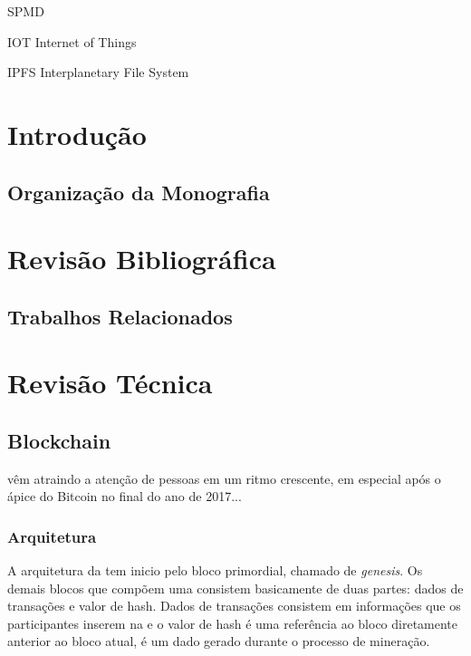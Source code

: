 \documentclass[tcc,capa]{texufpel}
\begin{document}
\listoffigures

\listoftables

\begin{listofabbrv}{SPMD}
        \item[IOT] Internet of Things
        \item[IPFS] Interplanetary File System
\end{listofabbrv}

\tableofcontents

\chapter{Introdução}

\section{Organização da Monografia}



\chapter{Revisão Bibliográfica}

\section{Trabalhos Relacionados}


\chapter{Revisão Técnica}

\section{Blockchain}

\Bchain vêm atraindo a atenção de pessoas em um ritmo crescente, em especial após o ápice do Bitcoin no final do ano de 2017...

	\subsection{Arquitetura}
    
    A arquitetura da \bchain tem inicio pelo bloco primordial, chamado de \textit{genesis}. Os demais blocos que compõem uma \bchain consistem basicamente de duas partes: dados de transações e valor de hash. Dados de transações consistem em informações que os participantes inserem na \bchain e o valor de hash é uma referência ao bloco diretamente anterior ao bloco atual, é um dado gerado durante o processo de mineração.
\end{document}
